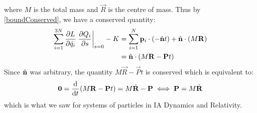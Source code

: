 \documentclass[../main.tex]{subfiles}
\begin{document}
\begin{example}
\[  \]
  where $M$ is the total mass and $\vec{R}$ is the centre of mass.
  Thus by \cref{boundConserved}, we have a conserved quantity:
  \begin{align*}
    \sum_{i = 1}^{3N} \pderiv{L}{\dot{q}_i} \at{\pderiv{Q_i}{s}}{s = 0} - K &= \sum_{i = 1}^{N} \vec{p}_i \cdot (- \uvec{n} t) +  \uvec{n} \cdot (M\vec{R}) \\
                                                                            &= \uvec{n} \cdot (M\vec{R} - \vec{P} t)
  \end{align*}
  Since $\hat{\mathbf{\bm{n}}}$ was arbitrary, the quantity $M\vec{R} - \vec{P}t$ is conserved which is equivalent to:
  \[
    \vec{0} = \deriv{}{t}(M\vec{R} - \vec{P} t) = M \dot{\vec{R}} - \vec{P} \iff \vec{P} = M \dot{\vec{R}}
  \]
  which is what we saw for systems of particles in IA Dynamics and Relativity.
\end{example}
\end{document}

